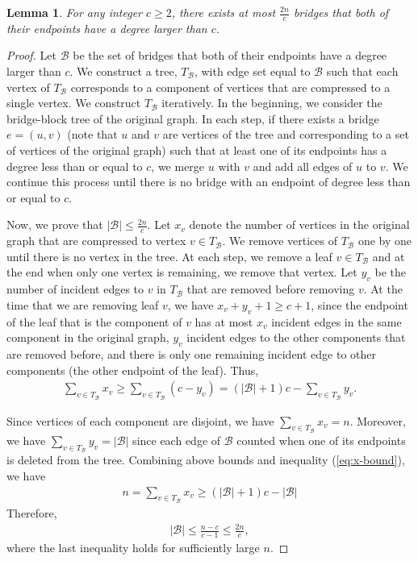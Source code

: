 \documentclass[letterpaper,11pt]{article}
\newtheorem{lemma}[theorem]{Lemma}
\newenvironment{myproof}{
\vspace{-0.5cm}
\begin{proof}
}{
\end{proof}
}
\begin{document}
\begin{lemma}\label{lem:few-high-deg-bridges}
For any integer $c \geq 2$, there exists at most $\frac{2n}{c}$ bridges that both of their endpoints have a degree larger than $c$. 
\end{lemma}
\begin{myproof}
Let $\mathcal{B}$ be the set of bridges that both of their endpoints have a degree larger than $c$. We construct a tree, $T_\mathcal{B}$, with edge set equal to $\mathcal{B}$ such that each vertex of $T_\mathcal{B}$ corresponds to a component of vertices that are compressed to a single vertex. We construct $T_\mathcal{B}$ iteratively. In the beginning, we consider the bridge-block tree of the original graph. In each step, if there exists a bridge $e = (u,v)$ (note that $u$ and $v$ are vertices of the tree and corresponding to a set of vertices of the original graph) such that at least one of its endpoints has a degree less than or equal to $c$, we merge $u$ with $v$ and add all edges of $u$ to $v$. We continue this process until there is no bridge with an endpoint of degree less than or equal to $c$.

Now, we prove that $|\mathcal{B}| \leq \frac{2n}{c}$. Let $x_v$ denote the number of vertices in the original graph that are compressed to vertex $v \in T_\mathcal{B}$. We remove vertices of $T_\mathcal{B}$ one by one until there is no vertex in the tree. At each step, we remove a leaf $v \in T_\mathcal{B}$ and at the end when only one vertex is remaining, we remove that vertex. Let $y_v$ be the number of incident edges to $v$ in $T_\mathcal{B}$ that are removed before removing $v$. At the time that we are removing leaf $v$, we have $x_v + y_v + 1\geq c + 1$, since the endpoint of the leaf that is the component of $v$ has at most $x_v$ incident edges in the same component in the original graph, $y_v$ incident edges to the other components that are removed before, and there is only one remaining incident edge to other components (the other endpoint of the leaf). Thus, 
\begin{align}\label{eq:x-bound}
    \sum_{v \in T_\mathcal{B}} x_v \geq \sum_{v \in T_\mathcal{B}} (c - y_v) = (|\mathcal{B}| + 1)c - \sum_{v \in T_\mathcal{B}}y_v.
\end{align}

Since vertices of each component are disjoint, we have $\sum_{v \in T_\mathcal{B}} x_v = n$. Moreover, we have $\sum_{v \in T_\mathcal{B}} y_v = |\mathcal{B}|$ since each edge of $\mathcal{B}$ counted when one of its endpoints is deleted from the tree. Combining above bounds and inequality (\ref{eq:x-bound}), we have
\begin{align*}
    n = \sum_{v \in T_\mathcal{B}} x_v \geq  (|\mathcal{B}| + 1)c - |\mathcal{B}|
\end{align*}
Therefore,
\begin{align*}
    |\mathcal{B}| \leq \frac{n - c}{c - 1} \leq \frac{2n}{c},
\end{align*}
where the last inequality holds for sufficiently large $n$.
\end{myproof}
\end{document}
